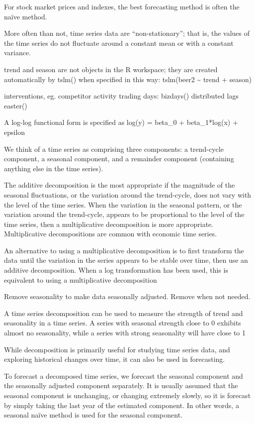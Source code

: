 \documentclass[]{book}
\begin{document}
For stock market prices and indexes, the best forecasting method is often the naïve method.

More often than not, time series data are ``non-stationary''; that is, the values of the time series do not fluctuate around a constant mean or with a constant variance.

trend and season are not objects in the R workspace; they are created automatically by tslm() when specified in this way: tslm(beer2 \textasciitilde{} trend + season)

interventions, eg. competitor activity \textbar{} trading days: bizdays() \textbar{} distributed lags \textbar{} easter()

A log-log functional form is specified as log(y) = beta\_0 + beta\_1*log(x) + epsilon

We think of a time series as comprising three components: a trend-cycle component, a seasonal component, and a remainder component (containing anything else in the time series).

The additive decomposition is the most appropriate if the magnitude of the seasonal fluctuations, or the variation around the trend-cycle, does not vary with the level of the time series. When the variation in the seasonal pattern, or the variation around the trend-cycle, appears to be proportional to the level of the time series, then a multiplicative decomposition is more appropriate. Multiplicative decompositions are common with economic time series.

An alternative to using a multiplicative decomposition is to first transform the data until the variation in the series appears to be stable over time, then use an additive decomposition. When a log transformation has been used, this is equivalent to using a multiplicative decomposition

Remove seasonality to make data seasonally adjusted. Remove when not needed.

A time series decomposition can be used to measure the strength of trend and seasonality in a time series. A series with seasonal strength close to 0 exhibits almost no seasonality, while a series with strong seasonality will have close to 1

While decomposition is primarily useful for studying time series data, and exploring historical changes over time, it can also be used in forecasting.

To forecast a decomposed time series, we forecast the seasonal component and the seasonally adjusted component separately. It is usually assumed that the seasonal component is unchanging, or changing extremely slowly, so it is forecast by simply taking the last year of the estimated component. In other words, a seasonal naïve method is used for the seasonal component.
\end{document}
